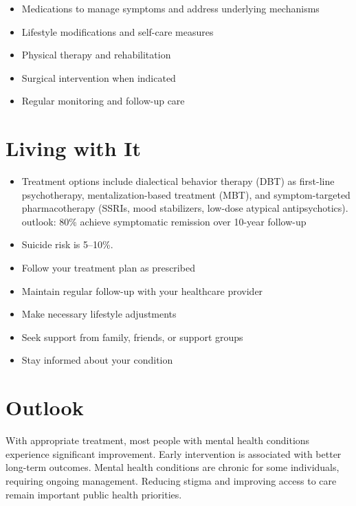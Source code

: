\begin{itemize}[noitemsep]
  \item Medications to manage symptoms and address underlying mechanisms
  \item Lifestyle modifications and self-care measures
  \item Physical therapy and rehabilitation
  \item Surgical intervention when indicated
  \item Regular monitoring and follow-up care
\end{itemize}
\section{Living with It}
\begin{itemize}[noitemsep]
  \item Treatment options include dialectical behavior therapy (DBT) as first-line psychotherapy, mentalization-based treatment (MBT), and symptom-targeted pharmacotherapy (SSRIs, mood stabilizers, low-dose atypical antipsychotics). outlook: 80\% achieve symptomatic remission over 10-year follow-up
  \item Suicide risk is 5--10\%.
  \item Follow your treatment plan as prescribed
  \item Maintain regular follow-up with your healthcare provider
  \item Make necessary lifestyle adjustments
  \item Seek support from family, friends, or support groups
  \item Stay informed about your condition
\end{itemize}
\section{Outlook}
With appropriate treatment, most people with mental health conditions experience significant improvement. Early intervention is associated with better long-term outcomes. Mental health conditions are chronic for some individuals, requiring ongoing management. Reducing stigma and improving access to care remain important public health priorities.
